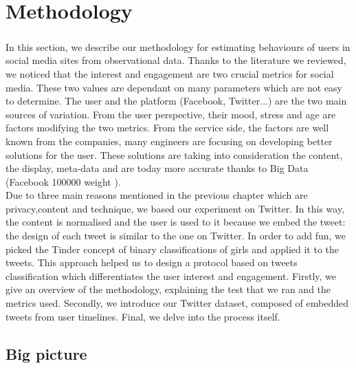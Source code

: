 \chapter{Methodology}

\paragraph{}
In this section, we describe our methodology for estimating behaviours of users in social media sites from observational data. Thanks to the literature we reviewed, we noticed that the interest and engagement are two crucial metrics for social media. These two values are dependant on many parameters which are not easy to determine. The user and the platform (Facebook, Twitter...) are the two main sources of variation. From the user perspective, their mood, stress and age \cite{f_youth_engagement} are factors modifying the two metrics. From the service side, the factors are well known from the companies, many engineers are focusing on developing better solutions for the user. These solutions are taking into consideration the content, the display, meta-data and are today more accurate thanks to Big Data (Facebook 100000 weight \cite{f_EdgeRank2}).\\
Due to three main reasons mentioned in the previous chapter which are privacy,content and technique, we based our experiment on Twitter. In this way, the content is normalised and the user is used to it because we embed the tweet: the design of each tweet is similar to the one on Twitter. In order to add fun, we picked the Tinder concept of binary classifications of girls and applied it to the tweets. This approach helped us to design a protocol based on tweets classification which differentiates the user interest and engagement.
Firstly, we give an overview of the methodology, explaining the test that we ran and the metrics used. Secondly, we introduce our Twitter dataset, composed of embedded tweets from user timelines. Final, we delve into the process itself.

\section{Big picture}

